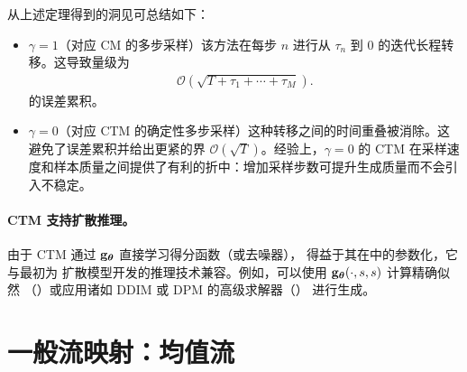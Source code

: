 从上述定理得到的洞见可总结如下：
\begin{itemize}
    \item {} $\gamma = 1$（对应 CM 的多步采样）该方法在每步 $n$ 进行从 $\tau_n$ 到 $0$ 的迭代长程转移。这导致量级为
    \begin{align*}
        \mathcal{O}\left(\sqrt{T + \tau_1 + \cdots + \tau_M}\right).
    \end{align*}
    的误差累积。

    \item {} $\gamma = 0$（对应 CTM 的确定性多步采样）这种转移之间的时间重叠被消除。这避免了误差累积并给出更紧的界 $\mathcal{O}(\sqrt{T})$。经验上，$\gamma = 0$ 的 CTM 在采样速度和样本质量之间提供了有利的折中：增加采样步数可提升生成质量而不会引入不稳定。
\end{itemize}


\paragraph{CTM 支持扩散推理。} 由于 CTM 通过 ${\mathbf{g}}_{\bm{\theta}}$ 直接学习得分函数（或去噪器），
得益于其在中的参数化，它与最初为
扩散模型开发的推理技术兼容。例如，可以使用 ${\mathbf{g}}_{\bm{\theta}}(\cdot, s, s)$
计算精确似然
（）或应用诸如 DDIM 或 DPM 的高级求解器（）
进行生成。




\newpage

\section{\texorpdfstring{一般流映射：均值流}{General Flow Map: Mean Flow}}\label{sec:MF}


